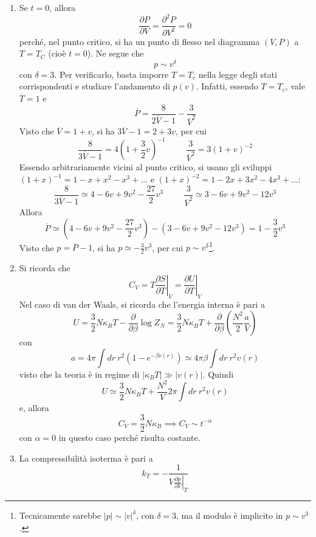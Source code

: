 \documentclass[11pt, a4paper]{scrartcl}
\theoremstyle{style}
\theoremstyle{style1}
\newcommand*\Eval[3]{\left.#1\right\rvert_{#2}^{#3}}
\numberwithin{equation}{subsection}
\begin{document}
\begin{enumerate}[(1).]
	\item Se $t=0$, allora
		\[
		\frac{\partial P}{\partial V} = \frac{\partial ^2P}{\partial V^2} = 0
		\] 
		perch\'e, nel punto critico, si ha un punto di flesso nel diagramma $(V,P)$ a $T=T_C$ (cio\`e $t=0$).
		Ne segue che 
		\[
		p \sim v^\delta 
		\] 
		con $\delta = 3$. 
		Per verificarlo, basta imporre $T=T_c$ nella legge degli stati corrispondenti e studiare l'andamento di $p(v)$.
		Infatti, essendo $T=T_c$, vale $\overline{T}=1$ e 
		\[
		\overline{P} = \frac{8}{2\overline{V}-1}- \frac{3}{\overline{V}^2}
		\] 
		Visto che $\overline{V}= 1+v$, si ha $3 \overline{V}-1 = 2 + 3v$, per cui
		\[
		\frac{8}{3\overline{V}-1}= 4 \left(1 + \frac{3}{2}v\right) ^{-1}\hspace{1cm} \frac{3}{\overline{V}^2} = 3 ( 1+ v)^{-2}
		\] 
	Essendo arbitrariamente vicini al punto critico, si usano gli sviluppi $(1+x)^{-1} = 1- x + x^2 -x^3 +\ldots$ e $(1+x)^{-2} = 1 - 2x + 3x^2 - 4x^3 +\ldots$:
\[
\frac{8}{3\overline{V}-1} \simeq 4 - 6v + 9 v^2 - \frac{27}{2}v^3 \hspace{1cm} \frac{3}{\overline{V}^2}\simeq 3 - 6 v + 9 v^2 - 12 v^3
\] 
Allora
\[
\overline{P}\simeq \left(4 - 6v + 9 v^2 - \frac{27}{2}v^3\right) -\left(3 - 6 v + 9 v^2 - 12 v^3\right) = 1 - \frac{3}{2}v^3
\] 
Visto che $p = \overline{P}-1$, si ha $p \simeq -\frac{3}{2}v^3$, per cui $p \sim v^3$\footnote{Tecnicamente sarebbe $\lvert p \rvert \sim\lvert v \rvert ^{\delta }$, con $\delta = 3$, ma il modulo \`e implicito in $p\sim v^3$.}.
	\item Si ricorda che
		\[
			C_V = T \Eval{\frac{\partial S}{\partial T} }{V}{} = \Eval{\frac{\partial U}{\partial T} }{V}{}
		\] 
		Nel caso di van der Waals, si ricorda che l'energia interna \`e pari a 
		\[
		U = \frac{3}{2}N \kappa _B T - \frac{\partial }{\partial \beta } \log Z_N = \frac{3}{2}N \kappa _B T + \frac{\partial }{\partial \beta } \left(\frac{N^2}{2}\frac{a}{V}\right) 
		\] 
		con 
		\[
		a = 4\pi \int dr \ r^2 \left(1- e ^{-\beta  v(r)}\right) \simeq 4\pi \beta  \int dr \ r^2 v(r)
		\] 
		visto che la teoria \`e in regime di $\lvert \kappa _B T \rvert \gg \lvert v(r) \rvert $.
		Quindi 
		\[
		U \simeq \frac{3}{2} N \kappa _B T + \frac{N^2}{V} 2\pi \int dr \ r^2 v(r)
		\] 
		e, allora
		\[
		C_V = \frac{3}{2}N \kappa _B \implies C_V \sim t ^{-\alpha }
		\] 
		con $\alpha  = 0$ in questo caso perch\'e risulta costante.
	\item La compressibilit\`a isoterma \`e pari a
		\[
			k_T = - \frac{1}{V \Eval{\frac{\partial p}{\partial V} }{T}{}}
\]
\end{enumerate}
\end{document}

